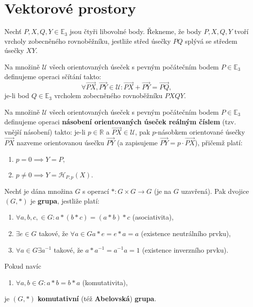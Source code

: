 \section{Vektorové prostory}
\begin{definition}
    Nechť $P, X, Q, Y\in \mathbb E_3$ jsou čtyři libovolné body. Řekneme, že body
    $P, X, Q, Y$ tvoří
    vrcholy zobecněného rovnoběžníku, jestliže střed úsečky $PQ$ splývá se středem úsečky
    $XY$.
\end{definition}

\begin{definition}
    Na množině $\mathscr U$ všech orientovaných úseček s pevným počátečním bodem
    $P\in \mathbb E_3$
    definujeme operaci sčítání takto:
    $$\forall \overrightarrow{PX}, \overrightarrow{PY} \in \mathscr U:
        \overrightarrow{PX} +  \overrightarrow{PY} = \overrightarrow{PQ},$$
    je-li bod $Q\in \mathbb E_3$
    vrcholem zobecněného rovnoběžníku $PXQY$.
\end{definition}

\begin{definition}
    Na množině $\mathscr U$ všech orientovaných úseček s pevným počátečním bodem
    $P\in \mathbb E_3$
    definujeme operaci \textbf{násobení orientovaných úseček reálným číslem}
    (tzv. vnější násobení) takto: je-li $p\in \mathbb R$ a $\overrightarrow{PX}\in \mathscr U$,
    pak $p$-násobkem orientované
    úsečky $\overrightarrow{PX}$ nazveme orientovanou úsečku $\overrightarrow{PY}$
    (a zapisujeme $\overrightarrow{PY}=p \cdot \overrightarrow{PX}$), přičemž
    platí:
    \begin{enumerate}[$i.$]
    \item $p=0 \implies Y=P,$
   	\item $p\ne 0 \implies Y = \mathscr H_{P,p}(X).$
    \end{enumerate}
\end{definition}

\begin{definition}
    Nechť je dána množina $G$ s operací $*:G\times G \to G$ (je na $G$ uzavřená).
    Pak dvojice $(G,*)$ je \textbf{grupa}, jestliže platí:
    \begin{enumerate}[$i.$]
        \item $\forall a,b,c, \in G: a*(b*c) = (a*b)*c$ (asociativita),
       	\item $\exists e \in G$ takové, že $\forall a\in G a*e=e*a=a$ (existence neutrálního prvku),
       	\item $\forall a\in G \exists a^{-1}$ takové, že $a*a^{-1}=a^{-1}a=1$ (existence inverzního prvku).
    \end{enumerate}
    Pokud navíc
    \begin{enumerate}[$iv.$]
        \item $\forall a,b \in G: a*b=b*a$ (komutativita),
    \end{enumerate}
    je $(G,*)$ \textbf{komutativní} (též \textbf{Abelovská}) \textbf{grupa}.
\end{definition}

